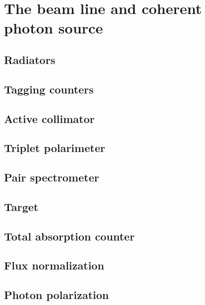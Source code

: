 
\section{The beam line and coherent photon source \label{sec:beamline}}
\subsection{Radiators \label{sec:radiators}}
\subsection{Tagging counters \label{sec:tag}}
\subsection{Active collimator \label{sec:coll}}
\subsection{Triplet polarimeter \label{sec:tpol}}
\subsection{Pair spectrometer \label{sec:ps}}
\subsection{Target \label{sec:target}}
\subsection{Total absorption counter \label{sec:tac}}
\subsection{Flux normalization \label{sec:fluxnorm}}
\subsection{Photon polarization \label{sec:polarization}}